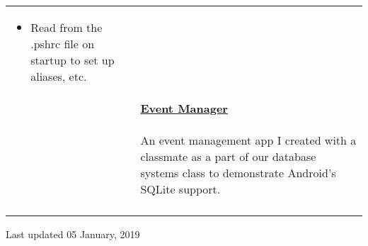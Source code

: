 \documentclass[letterpaper,11pt,oneside]{article}
\begin{document}
\begin{tabularx}{\textwidth}{l X}
\begin{itemize}[label={--}]
        \item Read from the .pshrc file on startup to set up aliases, etc.
    \end{itemize} \\
    & \vspace{-3ex}\textbf{\href{https://github.com/prati0100/EventManager}{Event Manager}} \\
    & \vspace{-2.5ex}\begin{adjustwidth}{}{}An event management app I created with a classmate as a part of our database systems class to demonstrate Android's SQLite support.\end{adjustwidth} \\
    & \\
\end{tabularx}

\centerline{Last updated 05 January, 2019}
\end{document}
